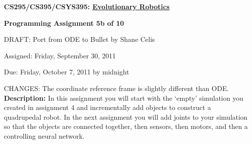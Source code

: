 \documentclass[12pt]{article}
\begin{document}
\centerline{\bf \Large CS295/CS395/CSYS395: \href{CS295_395_Syllabus.pdf}{\underline{Evolutionary Robotics}}}

\vspace{0.5cm}

\centerline{\bf \large Programming Assignment 5b of 10}
\vspace{0.25cm} \centerline{\color{red}DRAFT: Port from ODE to Bullet by Shane Celis \color{black}}

\vspace{0.5cm}

\centerline{\large Assigned: Friday, September 30, 2011}

\vspace{0.5cm}

\centerline{\large Due: Friday, October 7, 2011 by midnight}

\vspace{0.5cm}

\noindent \color{red}CHANGES: The coordinate reference frame is slightly different than ODE.\color{black}\\

\noindent \textbf{Description:} In this assignment you will start with the `empty' simulation you created in assignment 4 and incrementally add objects to construct a quadrupedal robot. In the next assignment you will add joints to your simulation so that the objects are connected together, then sensors, then motors, and then a controlling neural network.
\end{document}
